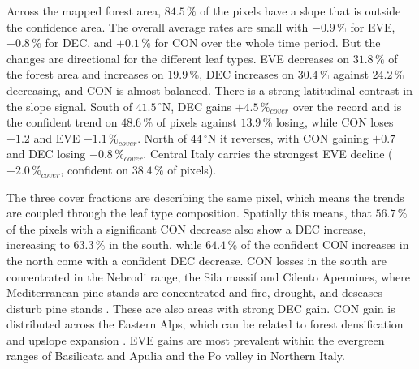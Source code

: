 \documentclass[essd, manuscript]{copernicus}
\begin{document}
Across the mapped forest area, $84.5\,\%$ of the pixels have a slope that is outside the confidence area. The overall average rates are small with $-0.9\,\%$ for EVE, $+0.8\,\%$ for DEC, and $+0.1\,\%$ for CON over the whole time period. But the changes are directional for the different leaf types. EVE decreases on $31.8\,\%$ of the forest area and increases on $19.9\,\%$, DEC increases on $30.4\,\%$ against $24.2\,\%$ decreasing, and CON is almost balanced. There is a strong latitudinal contrast in the slope signal. South of $41.5\,^{\circ}$N, DEC gains $+4.5\,\%_{cover}$ over the record and is the confident trend on $48.6\,\%$ of pixels against $13.9\,\%$ losing, while CON loses $-1.2$ and EVE $-1.1\,\%_{cover}$. North of $44\,^{\circ}$N it reverses, with CON gaining $+0.7$ and DEC losing $-0.8\,\%_{cover}$. Central Italy carries the strongest EVE decline ($-2.0\,\%_{cover}$, confident on $38.4\,\%$ of pixels).

The three cover fractions are describing the same pixel, which means the trends are coupled through the leaf type composition. Spatially this means, that $56.7\,\%$ of the pixels with a
significant CON decrease also show a DEC increase, increasing to $63.3\,\%$
in the south, while $64.4\,\%$ of the confident CON increases in the north
come with a confident DEC decrease. CON losses in the south are concentrated in the Nebrodi range, the Sila massif and Cilento Apennines, where Mediterranean pine stands are concentrated and fire, drought, and deseases disturb pine stands \citep{nicoletti_analysis_2024,herraiz_aridity-induced_2025,viana-soto_european_2025}. These are also areas with strong DEC gain. CON gain is distributed across the Eastern Alps, which can be related to forest densification and upslope expansion \citep{leonelli_climate_2011,tong_reforestation_2023}. EVE gains are most prevalent within the evergreen ranges of Basilicata and Apulia and the Po valley in Northern Italy. 
\end{document}
